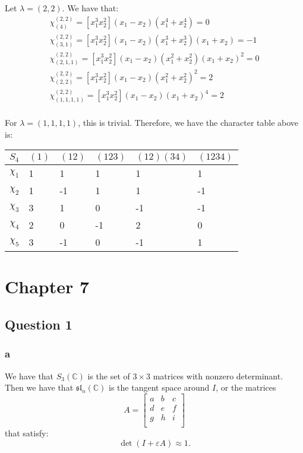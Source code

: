 \documentclass[]{article}
\begin{document}
Let $\lambda = (2,2)$. We have that:
\begin{align*}
	\chi^{(2,2)}_{(4)} = [x_1^3 x_2^2]( x_1 - x_2) (x_1^4 + x_2^4) = 0\\
	\chi^{(2,2)}_{(3,1)} = [x_1^3 x_2^2]( x_1 - x_2) (x_1^3 + x_2^3)(x_1 + x_2) = -1\\
	\chi^{(2,2)}_{(2,1,1)} = [x_1^3 x_2^2]( x_1 - x_2) (x_1^2 + x_2^2)(x_1 + x_2)^2 = 0\\
	\chi^{(2,2)}_{(2,2)} = [x_1^3 x_2^2]( x_1 - x_2) (x_1^2 + x_2^2)^2 = 2\\
	\chi^{(2,2)}_{(1,1,1,1)} = [x_1^3 x_2^2]( x_1 - x_2) (x_1 + x_2)^4 = 2\\
\end{align*}

For $\lambda = (1,1,1,1)$, this is trivial. 
Therefore, we have the character table above is:
\begin{table}[h!]
	\centering
	\begin{tabular}{|l|l|l|l|l|l|}
		\hline
		$S_4$    & $(1)$ & $(12)$ & $(123)$ & $(12)(34)$ & $(1234)$ \\ \hline
		$\chi_1$ & 1     & 1      & 1       & 1          & 1        \\ \hline
		$\chi_2$ & 1     & -1     & 1       & 1          & -1       \\ \hline
		$\chi_3$ & 3     & 1      & 0       & -1         & -1       \\ \hline
		$\chi_4$ & 2     & 0      & -1      & 2          & 0        \\ \hline
		$\chi_5$ & 3     & -1     & 0       & -1         & 1        \\ \hline
	\end{tabular}
\end{table}


\section*{Chapter 7}
\subsection*{Question 1}

\subsubsection*{a}
We have that $S_3(\mathbb{C})$ is the set of $3 \times 3$ matrices with nonzero determinant. 
Then we have that $\mathfrak{sl}_n(\mathbb{C})$ is the tangent space around $I$, or the matrices 
\begin{equation}
	A = 
\begin{bmatrix}
	a & b & c\\
	d & e & f\\
	g & h & i\\
\end{bmatrix}
\end{equation}
 that satisfy:
\begin{equation}
	\det \left(I + \varepsilon A\right) \approx 1.
\end{equation}
\end{document}
